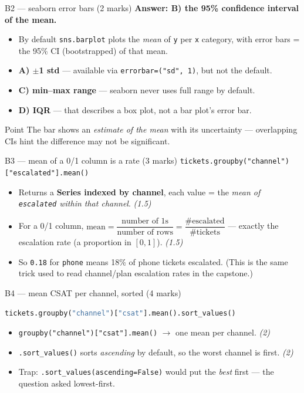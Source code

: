 \documentclass[aspectratio=169,11pt]{beamer}
\begin{document}
\begin{frame}{B2 --- seaborn error bars (2 marks)}
\textbf{Answer: B) the 95\% confidence interval of the mean.}
\begin{itemize}
  \item By default \texttt{sns.barplot} plots the \emph{mean} of \texttt{y} per \texttt{x} category,
        with error bars = the \textcolor{cgreen}{95\% CI} (bootstrapped) of that mean.
  \item \textbf{A) $\pm$1 std} --- available via \texttt{errorbar=("sd", 1)}, but not the default.
  \item \textbf{C) min--max range} --- seaborn never uses full range by default.
  \item \textbf{D) IQR} --- that describes a box plot, not a bar plot's error bar.
\end{itemize}
\begin{block}{Point}
\footnotesize The bar shows an \emph{estimate of the mean} with its uncertainty --- overlapping CIs hint the difference may not be significant.
\end{block}
\end{frame}

\begin{frame}[fragile]{B3 --- mean of a 0/1 column is a rate (3 marks)}
\texttt{tickets.groupby("channel")["escalated"].mean()}
\begin{itemize}
  \item Returns a \textbf{Series indexed by channel}, each value = the \emph{mean of
        \texttt{escalated} within that channel}. \hfill \emph{(1.5)}
  \item For a 0/1 column, $\text{mean} = \dfrac{\text{number of 1s}}{\text{number of rows}}
        = \dfrac{\#\text{escalated}}{\#\text{tickets}}$ --- exactly the \textcolor{cgreen}{escalation
        rate} (a proportion in $[0,1]$). \hfill \emph{(1.5)}
  \item So \texttt{0.18} for \texttt{phone} means 18\% of phone tickets escalated. (This is the same
        trick used to read channel/plan escalation rates in the capstone.)
\end{itemize}
\end{frame}

\begin{frame}[fragile]{B4 --- mean CSAT per channel, sorted (4 marks)}
\begin{lstlisting}[language=Python]
tickets.groupby("channel")["csat"].mean().sort_values()
\end{lstlisting}
\begin{itemize}
  \item \texttt{groupby("channel")["csat"].mean()} $\to$ one mean per channel. \hfill \emph{(2)}
  \item \texttt{.sort\_values()} sorts \emph{ascending} by default, so the worst channel is
        first. \hfill \emph{(2)}
  \item \textcolor{cred}{Trap:} \texttt{.sort\_values(ascending=False)} would put the \emph{best}
        first --- the question asked lowest-first.
\end{itemize}
\end{frame}
\end{document}
